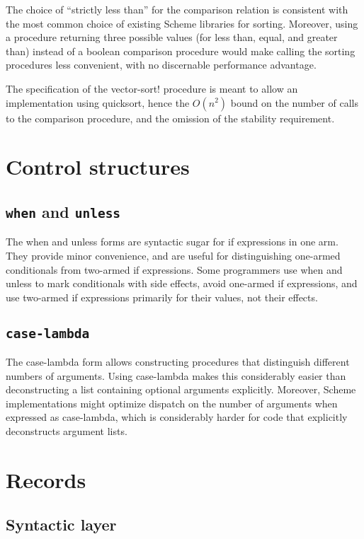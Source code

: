 \documentclass[twoside,twocolumn]{algol60}
\begin{document}
The choice of ``strictly less than'' for the comparison relation is
consistent with the most common choice of existing Scheme libraries
for sorting.  Moreover, using a procedure returning three possible
values (for less than, equal, and greater than) instead of a boolean
comparison procedure would make calling the sorting procedures less
convenient, with no discernable performance advantage.

The specification of the {\cf vector-sort!} procedure is meant to
allow an implementation using quicksort, hence the $O(n^2)$
bound on the number of calls to the comparison procedure, and the
omission of the stability requirement.

\chapter{Control structures}

\section{{\tt when} and {\tt unless}}

The {\cf when} and {\cf unless} forms are syntactic sugar for {\cf if}
expressions in one arm.  They provide minor convenience, and are
useful for distinguishing one-armed conditionals from two-armed {\cf
  if} expressions.  Some programmers use {\cf when} and {\cf unless}
to mark conditionals with side effects, avoid one-armed {\cf if}
expressions, and use two-armed {\cf if} expressions primarily for
their values, not their effects.

\section{{\tt case-lambda}}

The {\cf case-lambda} form allows constructing procedures that
distinguish different numbers of arguments.  Using {\cf case-lambda}
makes this considerably easier than deconstructing a list containing
optional arguments explicitly.  Moreover, Scheme implementations might
optimize dispatch on the number of arguments when expressed as {\cf
  case-lambda}, which is considerably harder for code that explicitly
deconstructs argument lists.

\chapter{Records}


\section{Syntactic layer}
\end{document}

